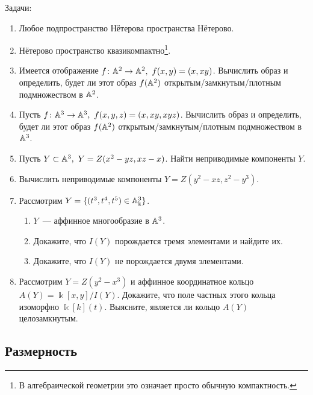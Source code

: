 		\begin{homework}
		Задачи:
		\begin{enumerate}
			\item Любое подпространство Нётерова пространства Нётерово. 

			\item Нётерово пространство квазикомпактно\footnote{В алгебраической геометрии это означает просто обычную компактность. }. 

			\item Имеется отображение $f\colon \AA^2 \to \AA^2, \ f(x, y) = (x, xy)$. Вычислить образ и определить, будет ли этот образ $f(\AA^2)$ открытым/замкнутым/плотным подмножеством в $\AA^2$. 

			\item Пусть $f\colon \AA^3 \to \AA^3, \ f(x, y, z) = (x, xy, xyz)$. Вычислить образ и определить, будет ли этот образ $f(\AA^2)$ открытым/замкнутым/плотным подмножеством в $\AA^3$. 

			\item Пусть $Y \subset \AA^3, \ Y = Z(x^2 - yz, xz - x)$. Найти неприводимые компоненты $Y$.

			\item Вычислить неприводимые компоненты $Y = Z(y^2 - xz, z^2 - y^3)$.

			\item Рассмотрим $Y = \{ (t^3, t^4, t^5) \in \AA_{\Bbbk}^3 \}$. 
					\begin{enumerate}
						\item $Y$~--- аффинное многообразие в $\AA^3$.

						\item Докажите, что $I(Y)$ порождается тремя элементами и найдите их. 

						\item Докажите, что $I(Y)$ не порождается двумя элементами. 
					\end{enumerate}

			\item Рассмотрим $Y = Z(y^2 - x^3)$ и аффинное координатное кольцо $A(Y) = \Bbbk[x, y]/I(Y)$. Докажите, что поле частных этого кольца изоморфно $\Bbbk[k](t)$. Выясните, является ли кольцо $A(Y)$ целозамкнутым. 


		\end{enumerate}
	\end{homework}

	\subsection{Размерность}

